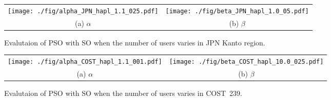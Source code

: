 \documentclass[10pt, letterpaper]{IEEEtran}
\begin{document}
\begin{CJK}{UTF8}{ipxm}
\begin{figure}[tb]
  \begin{center}
      \begin{tabular}{cc}
      \texttt{[image: ./fig/alpha\_JPN\_hapl\_1.1\_025.pdf]} &
      \texttt{[image: ./fig/beta\_JPN\_hapl\_1.0\_05.pdf]} \\
      (a) $\alpha$ & (b) $\beta$
      \end{tabular}
  \end{center}
  \caption{Evalutaion of PSO with SO when the number of users varies in JPN Kanto region.}
  \label{fig:OSA_alpha_beta_JPN}
\end{figure}

\begin{figure}[tb]
  \begin{center}
      \begin{tabular}{cc}
      \texttt{[image: ./fig/alpha\_COST\_hapl\_1.1\_001.pdf]} &
      \texttt{[image: ./fig/beta\_COST\_hapl\_10.0\_025.pdf]} \\
      (a) $\alpha$ & (b) $\beta$
      \end{tabular}
  \end{center}
  \caption{Evalutaion of PSO with SO when the number of users varies in COST~239.}
  \label{fig:OSA_alpha_beta_COST}
\end{figure}


\end{CJK}
\end{document}

